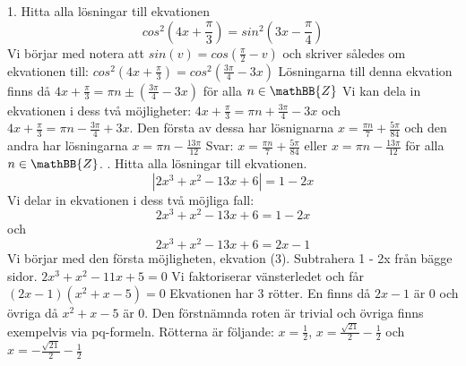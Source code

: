 \documentclass{article}
\begin{document}
  1. Hitta alla lösningar till ekvationen
  \begin{equation}
      cos^2(4x + \frac{\pi}{3}) = sin^2(3x-\frac{\pi}{4})
  \end{equation}
  Vi börjar med notera att $sin(v) = cos(\frac{\pi}{2} - v)$ och skriver således om ekvationen till: \newline\newline
  $cos^2(4x + \frac{\pi}{3}) = cos^2(\frac{3\pi}{4} - 3x)$\newline\newline
  Lösningarna till denna ekvation finns då $4x + \frac{\pi}{3} = \pi n \pm (\frac{3\pi}{4} - 3x)$ för alla $n \in \mathBB{Z}$\newline 
  Vi kan dela in ekvationen i dess två möjligheter:\newline
  $4x + \frac{\pi}{3} = \pi n + \frac{3\pi}{4} - 3x$ och $4x + \frac{\pi}{3} = \pi n - \frac{3\pi}{4} + 3x$.\newline
  Den första av dessa har lösnignarna $x = \frac{\pi n}{7} + \frac{5\pi}{84}$ och den andra har lösningarna $x = \pi n - \frac{13\pi}{12}$\newline\newline
  Svar: $x = \frac{\pi n}{7} + \frac{5\pi}{84}$ eller $x = \pi n - \frac{13\pi}{12}$ för alla $n \in \mathBB{Z}$.
  \newline {}. Hitta alla lösningar till ekvationen. 
  \begin{equation}
      |2x^3 + x^2 - 13x + 6| = 1 - 2x
  \end{equation}
  Vi delar in ekvationen i dess två möjliga fall:
  \begin{equation}
      2x^3 + x^2 - 13x + 6 = 1 - 2x
  \end{equation}
  och 
  \begin{equation}
      2x^3 + x^2 - 13x + 6 = 2x - 1
  \end{equation}
  Vi börjar med den första möjligheten, ekvation (3). Subtrahera 1 - 2x från bägge sidor. \newline \newline
  $2x^3 + x^2 - 11x + 5 = 0$ \newline \newline
  Vi faktoriserar vänsterledet och får \newline \newline
  $(2x - 1)(x^2 + x - 5) = 0$ \newline \newline
  Ekvationen har 3 rötter. En finns då $2x - 1$ är 0 och övriga då $x^2 + x - 5$ är 0. Den förstnämnda roten är trivial och övriga finns exempelvis via pq-formeln. Rötterna är följande: $x = \frac{1}{2}$, $x = \frac{\sqrt{21}}{2} - \frac{1}{2}$ och $x = -\frac{\sqrt{21}}{2} - \frac{1}{2}$ \newline \newline
\end{document}
